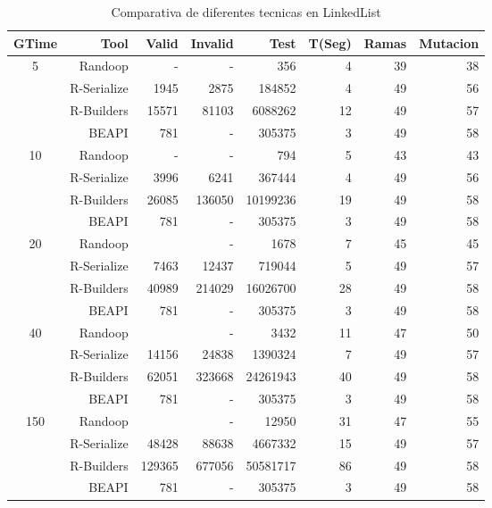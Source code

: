 \begin{table}[H]
\scriptsize
\centering
\begin{tabular}{ c  r  |r | r | r|r|r|r  }
  \toprule
  \textbf{GTime} & \textbf{Tool} & \textbf{Valid}  & \textbf{Invalid} & \textbf{Test}&\textbf{T(Seg)} &\textbf{Ramas}  & \textbf{Mutacion} \\ 
  \midrule
5	&	Randoop	&	-	&	-	&	356	&	4	&	39	&	38	\\
	&	R-Serialize	&	1945	&	2875	&	184852	&	4	&	49	&	56	\\
	&	R-Builders	&	15571	&	81103	&	6088262	&	12	&	49	&	57	\\
	&	BEAPI	&	781	&	-	&	305375	&	3	&	49	&	58	\\
 \cline{2-8}															
10	&	Randoop	&	-	&	-	&	794	&	5	&	43	&	43	\\
	&	R-Serialize	&	3996	&	6241	&	367444	&	4	&	49	&	56	\\
	&	R-Builders	&	26085	&	136050	&	10199236	&	19	&	49	&	58	\\
	&	BEAPI	&	781	&	-	&	305375	&	3	&	49	&	58	\\
 \cline{2-8}															
20	&	Randoop	&		&	-	&	1678	&	7	&	45	&	45	\\
	&	R-Serialize	&	7463	&	12437	&	719044	&	5	&	49	&	57	\\
	&	R-Builders	&	40989	&	214029	&	16026700	&	28	&	49	&	58	\\
	&	BEAPI	&	781	&	-	&	305375	&	3	&	49	&	58	\\
 \cline{2-8}															
40	&	Randoop	&		&	-	&	3432	&	11	&	47	&	50	\\
	&	R-Serialize	&	14156	&	24838	&	1390324	&	7	&	49	&	57	\\
	&	R-Builders	&	62051	&	323668	&	24261943	&	40	&	49	&	58	\\
	&	BEAPI	&	781	&	-	&	305375	&	3	&	49	&	58	\\
 \cline{2-8}															
150	&	Randoop	&		&	-	&	12950	&	31	&	47	&	55	\\
	&	R-Serialize	&	48428	&	88638	&	4667332	&	15	&	49	&	57	\\
	&	R-Builders	&	129365	&	677056	&	50581717	&	86	&	49	&	58	\\
	&	BEAPI	&	781	&	-	&	305375	&	3	&	49	&	58	\\
\midrule
\end{tabular}
\label{tab:linkedListTools}
\caption{Comparativa de diferentes tecnicas en LinkedList}
\end{table}


